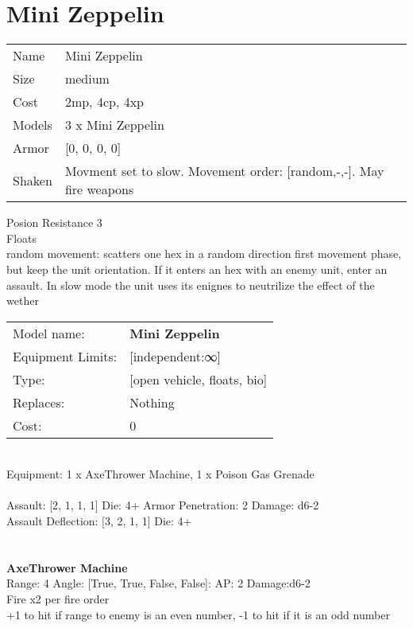 \section{ Mini Zeppelin }

\begin{tabular}{ll}
  Name & Mini Zeppelin \\
  Size & medium\\
  Cost & 2mp, 4cp, 4xp\\
  Models & 3 x Mini Zeppelin\\
  Armor & [0, 0, 0, 0]\\
  Shaken & Movment set to slow. Movement order: [random,-,-]. May fire weapons\\
\end{tabular}

\noindent Posion Resistance 3\\ 
Floats\\ 
random movement: scatters one hex in a random direction first movement phase, but keep the unit orientation. If it enters an hex with an enemy unit, enter an assault. In slow mode the unit uses its enignes to neutrilize the effect of the wether\\ 


\noindent
\begin{tabular}{ll}
Model name: &{\bf Mini Zeppelin } \\
Equipment Limits: &[independent:∞] \\
Type: &[open vehicle, floats, bio] \\
Replaces: &Nothing \\
Cost: & 0\\
\end{tabular}
\ \\
Equipment: 1 x AxeThrower Machine, 1 x Poison Gas Grenade \\
\ \\
Assault: [2, 1, 1, 1] Die: 4+ Armor Penetration: 2 Damage: d6-2 \\
Assault Deflection: [3, 2, 1, 1] Die: 4+\\
\indent  
\ \\

\ \\
{\bf AxeThrower Machine } \\



Range: 4  Angle: [True, True, False, False]: AP: 2 Damage:d6-2 \\
Fire x2 per fire order\\ 
+1 to hit if range to enemy is an even number, -1 to hit if it is an odd number\\ 




